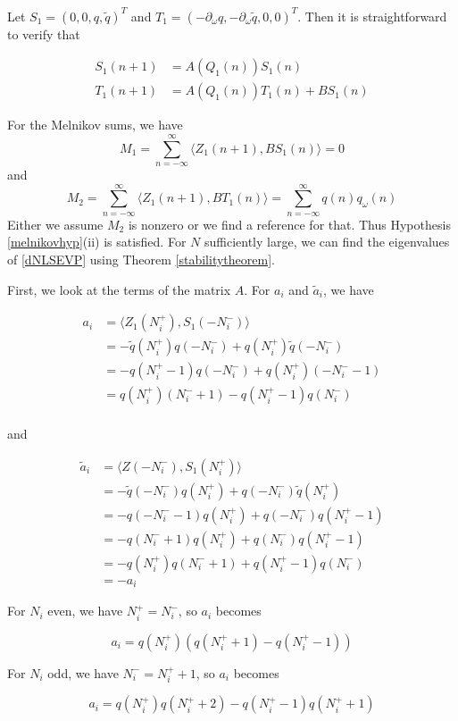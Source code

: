 \documentclass[12pt]{article}
\begin{document}
Let $S_1 = (0, 0, q, \tilde{q})^T$ and $T_1 = (-\partial_\omega q, -\partial_\omega \tilde{q}, 0, 0)^T$. Then it is straightforward to verify that

\begin{align*}
S_1(n+1) &= A(Q_1(n)) S_1(n) \\
T_1(n+1) &= A(Q_1(n)) T_1(n) + B S_1(n)
\end{align*}

For the Melnikov sums, we have
\[
M_1 = \sum_{n=-\infty}^\infty \langle Z_1(n+1), B S_1(n) \rangle = 0
\]
and
\[
M_2 = \sum_{n=-\infty}^\infty \langle Z_1(n+1), B T_1(n) \rangle =
\sum_{n=-\infty}^\infty q(n) q_\omega(n)
\]
Either we assume $M_2$ is nonzero or we find a reference for that. Thus Hypothesis \ref{melnikovhyp}(ii) is satisfied. For $N$ sufficiently large, we can find the eigenvalues of \eqref{dNLSEVP} using Theorem \ref{stabilitytheorem}. 

First, we look at the terms of the matrix $A$. For $a_i$ and $\tilde{a}_i$, we have

\begin{align*}
a_i &= \langle Z_1(N_i^+), S_1(-N_i^-) \rangle \\
&= -\tilde{q}(N_i^+)q(-N_i^-) + q(N_i^+)\tilde{q}(-N_i^-) \\
&= -q(N_i^+ - 1)q(-N_i^-) + q(N_i^+)(-N_i^- - 1) \\
&= q(N_i^+)(N_i^- + 1) - q(N_i^+ - 1)q(N_i^-)\\
\end{align*}

and

\begin{align*}
\tilde{a}_i &= \langle Z(-N_i^-), S_1(N_i^+) \rangle \\
&= -\tilde{q}(-N_i^-)q(N_i^+) + q(-N_i^-)\tilde{q}(N_i^+) \\
&= -q(-N_i^- - 1)q(N_i^+) + q(-N_i^-)q(N_i^+ - 1) \\
&= -q(N_i^- + 1)q(N_i^+) + q(N_i^-)q(N_i^+ - 1) \\
&= -q(N_i^+)q(N_i^- + 1) + q(N_i^+ - 1)q(N_i^-) \\
&= -a_i
\end{align*}

For $N_i$ even, we have $N_i^+ = N_i^-$, so $a_i$ becomes

\[
a_i = q(N_i^+)( q(N_i^+ + 1) - q(N_i^+ - 1) )
\]

For $N_i$ odd, we have $N_i^- = N_i^+ + 1$, so $a_i$ becomes

\[
a_i = q(N_i^+)q(N_i^+ + 2) - q(N_i^+ - 1)q(N_i^+ + 1)
\]
\end{document}
